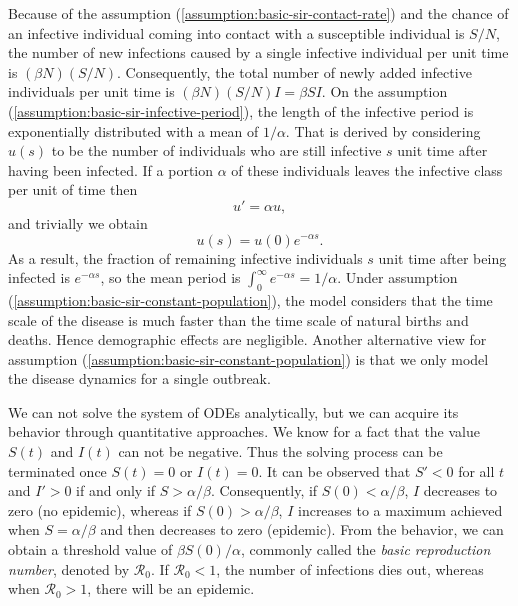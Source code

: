 Because of the assumption (\ref{assumption:basic-sir-contact-rate}) and the chance of an infective individual coming into contact with a susceptible individual is $S / N$, the number of new infections caused by a single infective individual per unit time is $(\beta N) (S / N)$.
Consequently, the total number of newly added infective individuals per unit time is $(\beta N) (S / N) I = \beta S I$.
On the assumption (\ref{assumption:basic-sir-infective-period}), the length of the infective period is exponentially distributed with a mean of $1 / \alpha$.
That is derived by considering $u(s)$ to be the number of individuals who are still infective $s$ unit time after having been infected.
If a portion $\alpha$ of these individuals leaves the infective class per unit of time then
\begin{equation}
    u' = \alpha u ,
\end{equation}
and trivially we obtain
\begin{equation}
    u(s) = u(0) e ^ {- \alpha s}.
\end{equation}
As a result, the fraction of remaining infective individuals $s$ unit time after being infected is $e ^ {- \alpha s}$, so the mean period is $\int_{0}^{\infty} e ^ {- \alpha s} = 1 / \alpha$.
Under assumption (\ref{assumption:basic-sir-constant-population}), the model considers that the time scale of the disease is much faster than the time scale of natural births and deaths.
Hence demographic effects are negligible.
Another alternative view for assumption (\ref{assumption:basic-sir-constant-population}) is that we only model the disease dynamics for a single outbreak.

We can not solve the system of \glspl{ODE} analytically, but we can acquire its behavior through quantitative approaches.
We know for a fact that the value $S(t)$ and $I(t)$ can not be negative.
Thus the solving process can be terminated once $S(t) = 0$ or $I(t) = 0$.
It can be observed that $S' < 0$ for all $t$ and $I' > 0$ if and only if $S > \alpha / \beta$.
Consequently, if $S(0) < \alpha / \beta$, $I$ decreases to zero (no epidemic), whereas if $S(0) > \alpha / \beta$, $I$ increases to a maximum achieved when $S = \alpha / \beta$ and then decreases to zero (epidemic).
From the behavior, we can obtain a threshold value of $\beta S(0) / \alpha$, commonly called the \textit{basic reproduction number}, denoted by $\mathcal{R}_0$.
If $\mathcal{R}_0 < 1$, the number of infections dies out, whereas when $\mathcal{R}_0 > 1$, there will be an epidemic.

